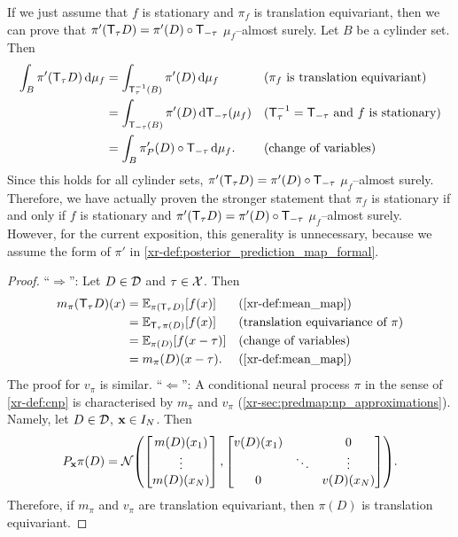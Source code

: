 \documentclass[12pt, twoside]{report}
\newcommand{\xrprefix}[1]{xr-#1}
\begin{document}
If we just assume that $f$ is stationary and $\pi_f$ is translation equivariant,
then we can prove that $\pi'(\T_{\tau} D) = \pi'(D) \comp \T_{-\tau}$ $\mu_f$--almost surely.
Let $B$ be a cylinder set.
Then
\begin{align}
    \int_B \pi'(\T_{\tau} D) \isd \mu_f
    &= \int_{\T^{-1}_{\tau}(B)} \pi'(D) \isd \mu_f  && \text{($\pi_f$ is translation equivariant)} \\
    &= \int_{\T_{-\tau}(B)} \pi'(D) \isd \mathsf{T}_{-\tau}(\mu_f) &&\text{($\T^{-1}_\tau = \T_{-\tau}$ and $f$ is stationary)}\\
    &= \int_B \pi'_P(D) \comp \T_{-\tau} \isd \mu_f. &&\text{(change of variables)}
\end{align}
Since this holds for all cylinder sets, $\pi'(\T_{\tau} D) = \pi'(D) \comp \T_{-\tau}$ $\mu_f$--almost surely.
Therefore, we have actually proven the stronger statement that
$\pi_f$ is stationary
if and only if
$f$ is stationary and $\pi'(\T_{\tau} D) = \pi'(D) \comp \T_{-\tau}$ $\mu_f$--almost surely.
However, for the current exposition, this generality is unnecessary,
because we assume the form of $\pi'$ in \cref{\xrprefix{def:posterior_prediction_map_formal}}.

\begin{proof}
    ``$\Rightarrow$'':
    Let $D \in \mathcal{D}$ and $\tau \in \mathcal{X}$.
    Then 
    \begin{align}
        m_\pi(\T_{\tau} D)(x)
        &= \E_{\pi(\T_\tau D)}[f(x)] && \text{(\cref{\xrprefix{def:mean_map}})} \\
        &= \E_{\T_\tau \pi(D)}[f(x)] && \text{(translation equivariance of $\pi$)} \\
        &= \E_{\pi(D)}[f(x - \tau)] && \text{(change of variables)} \\
        &= m_\pi(D)(x - \tau). && \text{(\cref{\xrprefix{def:mean_map}})}
    \end{align}
    The proof for $v_\pi$ is similar.
    ``$\Leftarrow$'':
    A conditional neural process $\pi$ in the sense of \cref{\xrprefix{def:cnp}} is characterised by $m_\pi$ and $v_\pi$ (\cref{\xrprefix{sec:predmap:np_approximations}}).
    Namely, let $D \in \mathcal{D}$, $\mathbf{x} \in I_N$.
    Then
    \begin{equation}
        P_\vx \pi(D) = \Normal\parens*{
            \begin{bmatrix}
                m(D)(x_1) \\ \vdots \\ m(D)(x_N)
            \end{bmatrix},
            \begin{bmatrix}
                v(D)(x_1) &  & 0 \\    
                 & \ddots & \vdots \\
                0 &  & v(D)(x_N)
            \end{bmatrix}
        }.
    \end{equation}
    Therefore, if $m_\pi$ and $v_\pi$ are translation equivariant, then $\pi(D)$ is translation equivariant.
\end{proof}
\end{document}
